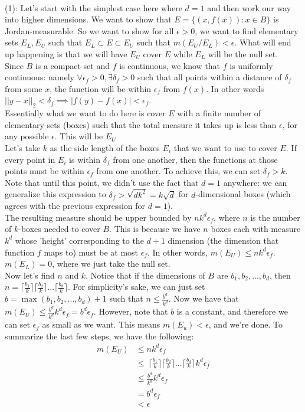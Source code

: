 \documentclass[answers,12pt]{exam}
\begin{document}
\begin{solution}\\
(1): Let's start with the simplest case here where $d=1$ and then work our way into higher dimensions. 
We want to show that $E = \{(x, f(x)): x \in B\}$ is Jordan-measurable.
So we want to show for all $\epsilon >0$, we want to find elementary sets $E_L,E_U$ such that $E_L \subset E \subset E_U$ such that $m(E_U/E_L)<\epsilon$. What will end up happening is that we will have $E_U$ cover $E$ while $E_L$ will be the null set.\\
Since $B$ is a compact set and $f$ is continuous, we know that $f$ is uniformly continuous: namely $\forall \epsilon_f >0, \exists \delta_f>0$ such that all points within a distance of $\delta_f$ from some $x$, the function will be within $\epsilon_f$ from $f(x)$.
In other words $||y-x||_2< \delta_f \implies |f(y)-f(x)| < \epsilon_f$.\\
Essentially what we want to do here is cover $E$ with a finite number of elementary sets (boxes) such that the total measure it takes up is less than $\epsilon$, for any possible $\epsilon$. This will be $E_U$\\
Let's take $k$ as the side length of the boxes $E_i$ that we want to use to cover $E$. 
If every point in $E_i$ is within $\delta_f$ from one another, then the functions at those points must be within $\epsilon_f$ from one another.
To achieve this, we can set $\delta_f > k$.
Note that until this point, we didn't use the fact that $d=1$ anywhere: we can generalize this expression to $\delta_f > \sqrt{dk^2} = k\sqrt{d}$ for $d$-dimensional boxes (which agrees with the previous expression for $d=1$).\\
The resulting measure should be upper bounded by $nk^d\epsilon_f$, where $n$ is the number of $k$-boxes needed to cover $B$. 
This is because we have $n$ boxes each with measure $k^d$ whose 'height' corresponding to the $d+1$ dimension (the dimension that function $f$ maps to) must be at most $\epsilon_f$.
In other words, $m(E_U) \leq nk^d\epsilon_f$.
$m(E_L) = 0$, where we just take the null set.\\
Now let's find $n$ and $k$.
Notice that if the dimensions of $B$ are $b_1, b_2, ..., b_d$, then $n = \lceil \frac{b_1}{k} \rceil \lceil \frac{b_2}{k} \rceil ... \lceil \frac{b_d}{k} \rceil$. 
For simplicity's sake, we can just set $b= \max(b_1,b_2,..., b_d)+1$ such that $n \leq \frac{b^d}{k^d}$.
Now we have that $m(E_U) \leq \frac{b^d}{k^d}k^d\epsilon_f = b^d \epsilon_f$. However, note that $b$ is a constant, and therefore we can set $\epsilon_f$ as small as we want. This means $m(E_u) < \epsilon$, and we're done.
To summarize the last few steps, we have the following:
\[
    \begin{aligned}
        m(E_U) &\leq nk^d\epsilon_f\\
        &\leq \ \lceil \frac{b_1}{k} \rceil \lceil \frac{b_2}{k} \rceil ... \lceil \frac{b_d}{k} \rceil k^d \epsilon_f \\
        &\leq \frac{b^d}{k^d}k^d \epsilon_f \\
        &= b^d \epsilon_f\\
        &< \epsilon
    \end{aligned}
\]


\end{solution}
\end{document}
